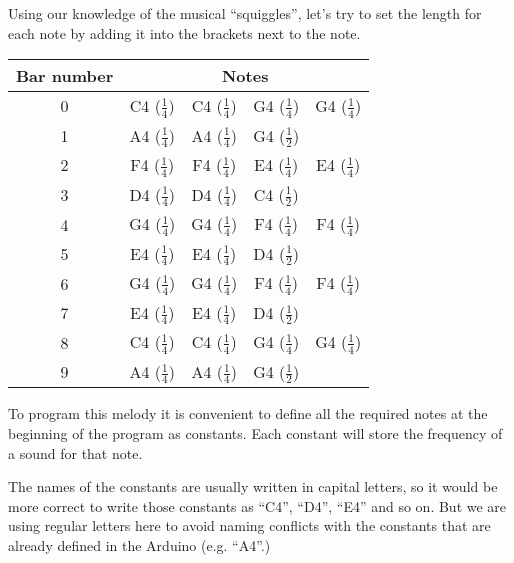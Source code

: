 \documentclass[../sparc.tex]{subfiles}
\begin{document}
Using our knowledge of the musical ``squiggles'', let's try to set the length
for each note by adding it into the brackets next to the note.

\begin{table}[ht]
  \centering
  \begin{tabular}{|*{5}{c|}}
    \hline
    \textbf{Bar number} & \multicolumn{4}{c|}{\textbf{Notes}} \\
    \hline
    0 & C4 ($\frac{1}{4}$) & C4 ($\frac{1}{4}$) & G4 ($\frac{1}{4}$) & G4 ($\frac{1}{4}$)
    \rule[-2ex]{0pt}{5ex}\\
    \hline
    1 & A4 ($\frac{1}{4}$) & A4 ($\frac{1}{4}$) & G4 ($\frac{1}{2}$) &
    \rule[-2ex]{0pt}{5ex}\\
    \hline
    2 & F4 ($\frac{1}{4}$) & F4 ($\frac{1}{4}$) & E4 ($\frac{1}{4}$) & E4 ($\frac{1}{4}$)
    \rule[-2ex]{0pt}{5ex}\\
    \hline
    3 & D4 ($\frac{1}{4}$) & D4 ($\frac{1}{4}$) & C4 ($\frac{1}{2}$) &
    \rule[-2ex]{0pt}{5ex}\\
    \hline
    4 & G4 ($\frac{1}{4}$) & G4 ($\frac{1}{4}$) & F4 ($\frac{1}{4}$) & F4 ($\frac{1}{4}$)
    \rule[-2ex]{0pt}{5ex}\\
    \hline
    5 & E4 ($\frac{1}{4}$) & E4 ($\frac{1}{4}$) & D4 ($\frac{1}{2}$) &
    \rule[-2ex]{0pt}{5ex}\\
    \hline
    6 & G4 ($\frac{1}{4}$) & G4 ($\frac{1}{4}$) & F4 ($\frac{1}{4}$) & F4 ($\frac{1}{4}$)
    \rule[-2ex]{0pt}{5ex}\\
    \hline
    7 & E4 ($\frac{1}{4}$) & E4 ($\frac{1}{4}$) & D4 ($\frac{1}{2}$) &
    \rule[-2ex]{0pt}{5ex}\\
    \hline
    8 & C4 ($\frac{1}{4}$) & C4 ($\frac{1}{4}$) & G4 ($\frac{1}{4}$) & G4 ($\frac{1}{4}$)
    \rule[-2ex]{0pt}{5ex}\\
    \hline
    9 & A4 ($\frac{1}{4}$) & A4 ($\frac{1}{4}$) & G4 ($\frac{1}{2}$) &
    \rule[-2ex]{0pt}{5ex}\\
    \hline
  \end{tabular}
  \label{table:twinkle-twinkle-little-star-notes-lengths}
\end{table}

To program this melody it is convenient to define all the required notes at the
beginning of the program as constants.  Each constant will store the frequency
of a sound for that note.

The names of the constants are usually written in capital letters, so it would
be more correct to write those constants as ``C4'', ``D4'', ``E4'' and so on.
But we are using regular letters here to avoid naming conflicts with the
constants that are already defined in the Arduino (e.g. ``A4''.)
\end{document}
